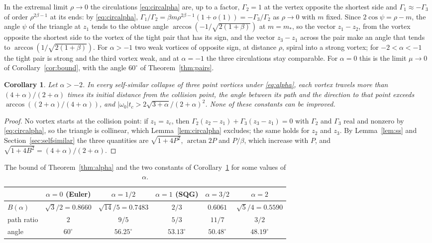 \documentclass[11pt]{article}
\newtheorem{corollary}{Corollary}
\theoremstyle{definition}
\begin{document}
In the extremal limit $\rho \to 0$ the circulations \eqref{eq:circalpha} are, up to a factor, $\Gamma_2 = 1$ at the vertex opposite the shortest side and $\Gamma_1 \approx -\Gamma_3$ of order $\rho^{2\beta - 1}$ at its ends: by \eqref{eq:circalpha}, $\Gamma_1/\Gamma_2 = \beta m\rho^{2\beta - 1}(1 + o(1)) = -\Gamma_3/\Gamma_2$ as $\rho \to 0$ with $m$ fixed. Since $2\cos\psi = \rho - m$, the angle $\psi$ of the triangle at $z_1$ tends to the obtuse angle $\arccos(-1/\sqrt{2(1 + \beta)})$ at $m = m_*$, so the vector $z_1 - z_2$, from the vortex opposite the shortest side to the vortex of the tight pair that has its sign, and the vector $z_3 - z_1$ across the pair make an angle that tends to $\arccos(1/\sqrt{2(1 + \beta)})$. For $\alpha > -1$ two weak vortices of opposite sign, at distance $\rho$, spiral into a strong vortex; for $-2 < \alpha < -1$ the tight pair is strong and the third vortex weak, and at $\alpha = -1$ the three circulations stay comparable. For $\alpha = 0$ this is the limit $\mu \to 0$ of Corollary~\ref{cor:bound}, with the angle $60^\circ$ of Theorem~\ref{thm:pairs}.

\begin{corollary}\label{cor:geom}
Let $\alpha > -2$. In every self-similar collapse of three point vortices under \eqref{eq:alpha}, each vortex travels more than $(4 + \alpha)/(2 + \alpha)$ times its initial distance from the collision point, the angle between its path and the direction to that point exceeds $\arccos((2 + \alpha)/(4 + \alpha))$, and $|\omega_0| t_c > 2\sqrt{3 + \alpha}/(2 + \alpha)^2$. None of these constants can be improved.
\end{corollary}

\begin{proof}
No vortex starts at the collision point: if $z_1 = z_c$, then $\Gamma_2(z_2 - z_1) + \Gamma_3(z_3 - z_1) = 0$ with $\Gamma_2$ and $\Gamma_3$ real and nonzero by \eqref{eq:circalpha}, so the triangle is collinear, which Lemma~\ref{lem:circalpha} excludes; the same holds for $z_2$ and $z_3$. By Lemma~\ref{lem:ss} and Section~\ref{sec:selfsimilar} the three quantities are $\sqrt{1 + 4P^2}$, $\arctan 2P$ and $P/\beta$, which increase with $P$, and $\sqrt{1 + 4B^2} = (4 + \alpha)/(2 + \alpha)$.
\end{proof}

\begin{table}[ht]
\centering
\begin{tabular}{lccccc}
\toprule
 & $\alpha = 0$ (Euler) & $\alpha = 1/2$ & $\alpha = 1$ (SQG) & $\alpha = 3/2$ & $\alpha = 2$ \\
\midrule
$B(\alpha)$ & $\sqrt3/2 = 0.8660$ & $\sqrt{14}/5 = 0.7483$ & $2/3$ & $0.6061$ & $\sqrt5/4 = 0.5590$ \\
path ratio & $2$ & $9/5$ & $5/3$ & $11/7$ & $3/2$ \\
angle & $60^\circ$ & $56.25^\circ$ & $53.13^\circ$ & $50.48^\circ$ & $48.19^\circ$ \\
\bottomrule
\end{tabular}
\caption{The bound of Theorem~\ref{thm:alpha} and the two constants of Corollary~\ref{cor:geom} for some values of $\alpha$.}
\label{tab:values}
\end{table}
\end{document}

